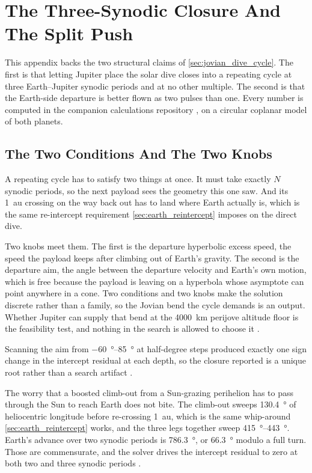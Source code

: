 \documentclass{article}
\begin{document}
\section{The Three-Synodic Closure And The Split Push}\label{sec:jovian_dive_closure}
This appendix backs the two structural claims of \autoref{sec:jovian_dive_cycle}. The first is that letting Jupiter place the solar dive closes into a repeating cycle at three Earth--Jupiter synodic periods and at no other multiple. The second is that the Earth-side departure is better flown as two pulses than one. Every number is computed in the companion calculations repository \cite{Katz_aim_is_all_you_need_2025}, on a circular coplanar model of both planets.

\subsection*{The Two Conditions And The Two Knobs}
A repeating cycle has to satisfy two things at once. It must take exactly $N$ synodic periods, so the next payload sees the geometry this one saw. And its \SI{1}{\astronomicalunit} crossing on the way back out has to land where Earth actually is, which is the same re-intercept requirement \autoref{sec:earth_reintercept} imposes on the direct dive.

Two knobs meet them. The first is the departure hyperbolic excess speed, the speed the payload keeps after climbing out of Earth's gravity. The second is the departure aim, the angle between the departure velocity and Earth's own motion, which is free because the payload is leaving on a hyperbola whose asymptote can point anywhere in a cone. Two conditions and two knobs make the solution discrete rather than a family, so the Jovian bend the cycle demands is an output. Whether Jupiter can supply that bend at the \SI{4000}{\kilo\meter} perijove altitude floor is the feasibility test, and nothing in the search is allowed to choose it \cite{Katz_aim_is_all_you_need_2025}.

Scanning the aim from \SIrange{-60}{85}{\degree} at half-degree steps produced exactly one sign change in the intercept residual at each depth, so the closure reported is a unique root rather than a search artifact \cite{Katz_aim_is_all_you_need_2025}.

The worry that a boosted climb-out from a Sun-grazing perihelion has to pass through the Sun to reach Earth does not bite. The climb-out sweeps \SI{130.4}{\degree} of heliocentric longitude before re-crossing \SI{1}{\astronomicalunit}, which is the same whip-around \autoref{sec:earth_reintercept} works, and the three legs together sweep \SIrange{415}{443}{\degree}. Earth's advance over two synodic periods is \SI{786.3}{\degree}, or \SI{66.3}{\degree} modulo a full turn. Those are commensurate, and the solver drives the intercept residual to zero at both two and three synodic periods \cite{Katz_aim_is_all_you_need_2025}.
\end{document}
